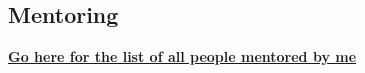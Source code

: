 \documentclass[margin,line]{resume}
\begin{document}
\begin{resume}
 	\section{\mysidestyle Mentoring}
	\textbf{\href{https://sivaramambikasaran.com/research/}{Go here for the list of all people mentored by me}}


\end{resume}
\end{document}

